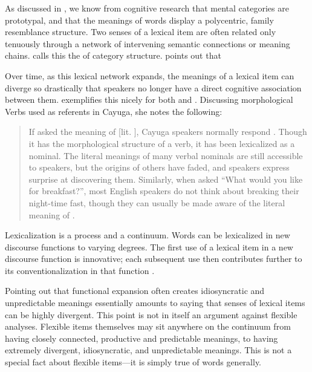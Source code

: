 As discussed in , we know from cognitive research that mental categories are prototypal, and that the meanings of words display a polycentric, family resemblance structure. Two senses of a lexical item are often related only tenuously through a network of intervening semantic connections or meaning chains. \textcite{Langacker1988} calls this the  of category structure. \citeauthor{Taylor2003} points out that 

Over time, as this lexical network expands, the meanings of a lexical item can diverge so drastically that speakers no longer have a direct cognitive association between them. \citeauthor{Mithun2000} exemplifies this nicely for both  and . Discussing morphological Verbs used as referents in Cayuga, she notes the following:

\blockquote[{\cite[413]{Mithun2000}}]{If asked the meaning of  [lit. ], Cayuga speakers normally respond . Though it has the morphological structure of a verb, it has been lexicalized as a nominal. The literal meanings of many verbal nominals are still accessible to speakers, but the origins of others have faded, and speakers express surprise at discovering them. Similarly, when asked \enquote{What would you like for breakfast?}, most English speakers do not think about breaking their night-time fast, though they can usually be made aware of the literal meaning of .}

\noindent Lexicalization is a process and a continuum. Words can be lexicalized in new discourse functions to varying degrees. The first use of a lexical item in a new discourse function is innovative; each subsequent use then contributes further to its conventionalization in that function \parencite[166]{Mithun2017}.

Pointing out that functional expansion often creates idiosyncratic and unpredictable meanings essentially amounts to saying that senses of lexical items can be highly divergent. This point is not in itself an argument against flexible analyses. Flexible items themselves may sit anywhere on the continuum from having closely connected, productive and predictable meanings, to having extremely divergent, idiosyncratic, and unpredictable meanings. This is not a special fact about flexible items—it is simply true of words generally.

